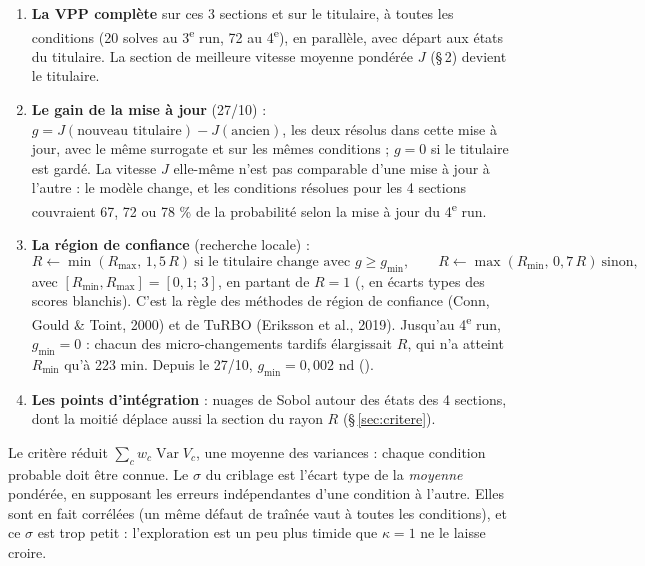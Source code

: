 \documentclass[10pt,a4paper]{article}
\DeclareMathOperator{\Var}{Var}
\begin{document}
\begin{enumerate}
  \item \textbf{La VPP complète} sur ces 3 sections et sur le titulaire, à toutes les conditions (20 solves
        au 3\textsuperscript{e} run, 72 au 4\textsuperscript{e}), en parallèle, avec départ aux états du
        titulaire. La section de meilleure vitesse moyenne pondérée $J$ (§\,2) devient le titulaire.
  \item \textbf{Le gain de la mise à jour} (27/10) : $g=J(\text{nouveau titulaire})-J(\text{ancien})$, les
        deux résolus dans cette mise à jour, avec le même surrogate et sur les mêmes conditions ; $g=0$ si le
        titulaire est gardé. La vitesse $J$ elle-même n'est pas comparable d'une mise à jour à l'autre : le
        modèle change, et les conditions résolues pour les 4 sections couvraient 67, 72 ou 78 \% de la
        probabilité selon la mise à jour du 4\textsuperscript{e} run.
  \item \textbf{La région de confiance} (recherche locale) :
        \[
          R\leftarrow\min(R_{\max},\,1{,}5\,R)\ \text{si le titulaire change avec } g\ge g_{\min},\qquad
          R\leftarrow\max(R_{\min},\,0{,}7\,R)\ \text{sinon},
        \]
        avec $[R_{\min},R_{\max}]=[0{,}1;\,3]$, en partant de $R=1$ (, en écarts types des scores
        blanchis). C'est la règle des
        méthodes de région de confiance (Conn, Gould \& Toint, 2000) et de TuRBO (Eriksson et al., 2019).
        Jusqu'au 4\textsuperscript{e} run, $g_{\min}=0$ : chacun des micro-changements tardifs élargissait $R$,
        qui n'a atteint $R_{\min}$ qu'à 223 min. Depuis le 27/10, $g_{\min}=0{,}002$ nd ().
  \item \textbf{Les points d'intégration} : nuages de Sobol autour des états des 4 sections, dont la moitié
        déplace aussi la section du rayon $R$ (§\,\ref{sec:critere}).
\end{enumerate}

\begin{subtilite}
Le critère réduit $\sum_c w_c\Var V_c$, une moyenne des variances : chaque condition probable doit être
connue. Le $\sigma$ du criblage est l'écart type de la \emph{moyenne} pondérée, en supposant les erreurs
indépendantes d'une condition à l'autre. Elles sont en fait corrélées (un même défaut de traînée vaut à
toutes les conditions), et ce $\sigma$ est trop petit : l'exploration est un peu plus timide que $\kappa=1$
ne le laisse croire.
\end{subtilite}
\end{document}
